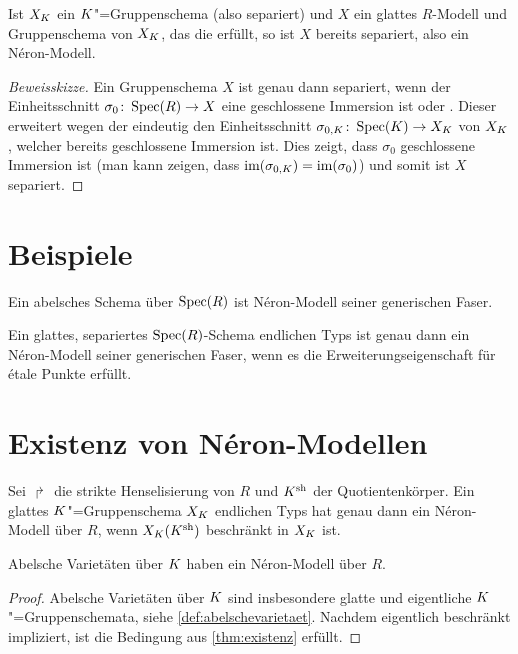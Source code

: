 \documentclass[german]{scrreprt}
\begin{document}
\begin{Bemerkung}\label{nerongruppenschemaglatt}
  Ist $X_{K}$ ein $K$"=Gruppenschema (also separiert) und $X$ ein
  glattes $R$-Modell und Gruppenschema von $X_{K}$, das die
  \NAbbEig erfüllt, so ist $X$ bereits separiert,
  also ein Néron-Modell.
  \cite[1.2, Remark 7]{neron} 
  \begin{proof}[Beweisskizze]
    Ein Gruppenschema $X$ ist genau dann separiert, wenn der
    Einheitsschnitt $\sigma_0\colon\operatorname{Spec}(R)\to X$ eine geschlossene
    Immersion ist
    \cite[Lemma 38.6.1]{stacksproject} oder \cite[7.1, Lemma 2]{neron}.
    Dieser erweitert wegen der \NAbbEig eindeutig
    den Einheitsschnitt $\sigma_{0,K}\colon\operatorname{Spec}(K)\to X_{K}$ von
    $X_{K}$, welcher bereits geschlossene Immersion ist.
    Dies zeigt, dass $\sigma_0$ geschlossene Immersion ist
    (man kann zeigen, dass $\text{im}(\sigma_{0,K})=\text{im}(\sigma_0)$) und
    somit ist $X$ separiert. 
  \end{proof}
\end{Bemerkung}



\section{Beispiele}

\begin{Satz}
  Ein abelsches Schema über $\operatorname{Spec}(R)$ ist Néron-Modell seiner
  generischen Faser.
  \cite[1.2, Proposition 8]{neron}
\end{Satz}

\begin{Satz}
  Ein glattes, separiertes $\operatorname{Spec}(R)$-Schema endlichen Typs ist genau
  dann ein Néron-Modell seiner generischen Faser, wenn es die
  Erweiterungseigenschaft für étale Punkte erfüllt.
  \cite[1.2, Criterion 9]{neron}
\end{Satz}


\section{Existenz von Néron-Modellen}

\begin{Satz}\label{thm:existenz}
  Sei $\Rsh$ die strikte Henselisierung von $R$ und $K^{\text{sh}}$ der
  Quotientenkörper. Ein glattes $K$"=Gruppenschema $X_{K}$ endlichen
  Typs hat genau dann ein Néron-Modell über $R$, wenn $X_{K}(K^{\text{sh}})$
  beschränkt in $X_{K}$ ist.
  \cite[1.3, Theorem 1]{neron}
\end{Satz}
\begin{Korollar}\label{thm:exneronmodellabvarietaet}
  Abelsche Varietäten über $K$ haben ein Néron-Modell über $R$.
  \begin{proof}
    Abelsche Varietäten über $K$ sind insbesondere glatte und
    eigentliche $K$"=Gruppenschemata, siehe
    \autoref{def:abelschevarietaet}.
    Nachdem eigentlich beschränkt impliziert, ist die Bedingung aus
    \autoref{thm:existenz} erfüllt.
  \end{proof}
\end{Korollar}
\end{document}
